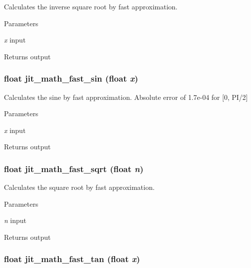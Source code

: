 Calculates the inverse square root by fast approximation. 
\begin{DoxyParams}{Parameters}
\item[{\em x}]input \end{DoxyParams}
\begin{DoxyReturn}{Returns}
output 
\end{DoxyReturn}
\hypertarget{group__mathmod_gaaa6b6cb9d099ef000e3c6c5f57b0ea92}{
\subsubsection[{jit\_\-math\_\-fast\_\-sin}]{\setlength{\rightskip}{0pt plus 5cm}float jit\_\-math\_\-fast\_\-sin (float {\em x})}}
\label{group__mathmod_gaaa6b6cb9d099ef000e3c6c5f57b0ea92}


Calculates the sine by fast approximation. Absolute error of 1.7e-\/04 for \mbox{[}0, PI/2\mbox{]}


\begin{DoxyParams}{Parameters}
\item[{\em x}]input \end{DoxyParams}
\begin{DoxyReturn}{Returns}
output 
\end{DoxyReturn}
\hypertarget{group__mathmod_ga037a0ddcef293492e1c683d70bd59890}{
\subsubsection[{jit\_\-math\_\-fast\_\-sqrt}]{\setlength{\rightskip}{0pt plus 5cm}float jit\_\-math\_\-fast\_\-sqrt (float {\em n})}}
\label{group__mathmod_ga037a0ddcef293492e1c683d70bd59890}


Calculates the square root by fast approximation. 
\begin{DoxyParams}{Parameters}
\item[{\em n}]input \end{DoxyParams}
\begin{DoxyReturn}{Returns}
output 
\end{DoxyReturn}
\hypertarget{group__mathmod_gaf78d2726613e3785b5aa28e7b6cfb0d7}{
\subsubsection[{jit\_\-math\_\-fast\_\-tan}]{\setlength{\rightskip}{0pt plus 5cm}float jit\_\-math\_\-fast\_\-tan (float {\em x})}}
\label{group__mathmod_gaf78d2726613e3785b5aa28e7b6cfb0d7}


